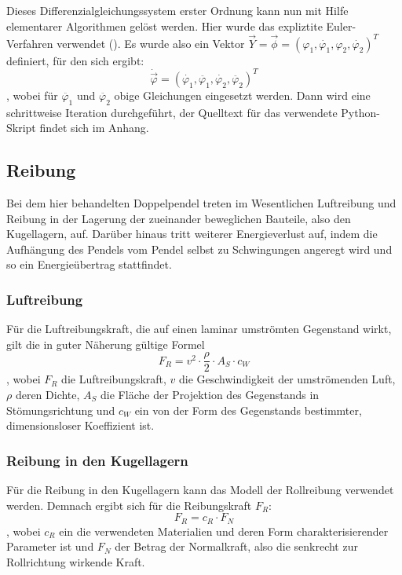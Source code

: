Dieses Differenzialgleichungssystem erster Ordnung kann nun mit Hilfe elementarer Algorithmen gelöst werden. Hier wurde das expliztite Euler-Verfahren verwendet (\cite{eul}). Es wurde also ein Vektor $\vec{Y} = \vec{\phi} = (
\varphi_1, \dot{\varphi_1}, \varphi_2 , \dot{\varphi_2})^{T} $
 definiert, für den sich ergibt: 
\begin{equation}
\dot{\vec{\varphi}} = (\dot{\varphi_1}, \ddot{\varphi_1}, \dot{\varphi_2}, \ddot{\varphi_2})^{T}
\end{equation}
, wobei für $ \ddot{\varphi_1} $ und $ \ddot{\varphi_2} $ obige Gleichungen eingesetzt werden. 
Dann wird eine schrittweise Iteration durchgeführt, der Quelltext für das verwendete Python-Skript findet sich im Anhang. 

\subsection{Reibung}
Bei dem hier behandelten Doppelpendel treten im Wesentlichen Luftreibung und Reibung in der Lagerung der zueinander beweglichen Bauteile, also den Kugellagern, auf. Darüber hinaus tritt weiterer Energieverlust auf, indem die Aufhängung des Pendels vom Pendel selbst zu Schwingungen angeregt wird und so ein Energieübertrag stattfindet. 

\subsubsection{Luftreibung}
Für die Luftreibungskraft, die auf einen laminar umströmten Gegenstand wirkt, gilt die in guter Näherung gültige Formel
\begin{equation}
F_R = v^2 \cdot \frac{\rho}{2} \cdot A_S \cdot c_W
\end{equation}, 
wobei $ F_R $ die Luftreibungskraft, $ v $ die Geschwindigkeit der umströmenden Luft, $ \rho $ deren Dichte, $ A_S $ die Fläche der Projektion des Gegenstands in Stömungsrichtung und $ c_W $ ein von der Form des Gegenstands bestimmter, dimensionsloser Koeffizient ist. 


\subsubsection{Reibung in den Kugellagern}
Für die Reibung in den Kugellagern kann das Modell der Rollreibung verwendet werden. Demnach ergibt sich für die Reibungskraft $ F_R $:
\begin{equation}
F_R = c_R \cdot F_N
\end{equation}, 
wobei $ c_R $ ein die verwendeten Materialien und deren Form charakterisierender Parameter ist und $ F_N $ der Betrag der Normalkraft, also die senkrecht zur Rollrichtung wirkende Kraft. 

